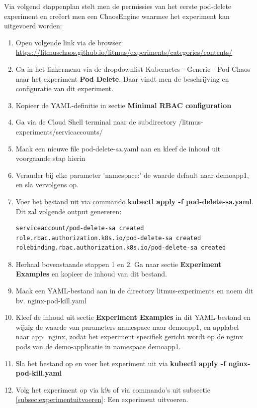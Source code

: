 Via volgend stappenplan stelt men de permissies van het eerste pod-delete experiment en creëert men een ChaosEngine waarmee het experiment kan uitgevoerd worden: 
\begin{enumerate}
    \item Open volgende link via de browser: \url{https://litmuschaos.github.io/litmus/experiments/categories/contents/} 
    \item Ga in het linkermenu via de dropdownlist Kubernetes - Generic - Pod Chaos naar het experiment {\bf Pod Delete}. Daar vindt men de beschrijving en configuratie van dit experiment.
    \item Kopieer de YAML-definitie in sectie {\bf Minimal RBAC configuration}
    \item Ga via de Cloud Shell terminal naar de subdirectory /litmus-experiments/servicaccounts/
    \item Maak een nieuwe file pod-delete-sa.yaml aan en kleef de inhoud uit voorgaande stap hierin
    \item Verander bij elke parameter 'namespace:' de waarde default naar demoapp1, en sla vervolgens op.
    \item Voer het bestand uit via commando {\bf kubectl apply -f pod-delete-sa.yaml}. Dit zal volgende output genereren:
\begin{lstlisting}[language=bash]    
serviceaccount/pod-delete-sa created
role.rbac.authorization.k8s.io/pod-delete-sa created
rolebinding.rbac.authorization.k8s.io/pod-delete-sa created
\end{lstlisting}
    \item Herhaal bovenstaande stappen 1 en 2. Ga naar sectie {\bf Experiment Examples} en kopieer de inhoud van dit bestand.
    \item Maak een YAML-bestand aan in de directory litmus-experiments en noem dit bv. nginx-pod-kill.yaml
    \item Kleef de inhoud uit sectie {\bf Experiment Examples} in dit YAML-bestand en wijzig  de waarde van parameters namespace naar demoapp1, en applabel naar app=nginx, zodat het experiment specifiek gericht wordt op de nginx pods van de demo-applicatie in namespace demoapp1.
    \item Sla het bestand op en voer het experiment uit via {\bf kubectl apply -f nginx-pod-kill.yaml}
    \item Volg het experiment op via k9s of via commando's uit subsectie \ref{subsec:experimentuitvoeren}: Een experiment uitvoeren.
\end{enumerate}

